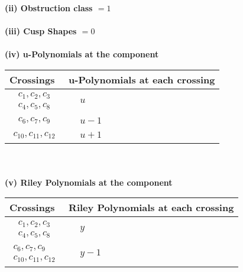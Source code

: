 \documentclass[1p]{elsarticle_modified}
\theoremstyle{definition}
\begin{document}
\flushleft \textbf{(ii) Obstruction class $= 1$}\\~\\
\flushleft \textbf{(iii) Cusp Shapes $= 0$}\\~\\
\newpage\renewcommand{\arraystretch}{1}
\flushleft \textbf{(iv) u-Polynomials at the component}\newline \\
\begin{tabular}{m{50pt}|m{274pt}}
Crossings & \hspace{64pt}u-Polynomials at each crossing \\
\hline $$\begin{aligned}c_{1},c_{2},c_{3}\\c_{4},c_{5},c_{8}\end{aligned}$$&$\begin{aligned}
&u
\end{aligned}$\\
\hline $$\begin{aligned}c_{6},c_{7},c_{9}\end{aligned}$$&$\begin{aligned}
&u-1
\end{aligned}$\\
\hline $$\begin{aligned}c_{10},c_{11},c_{12}\end{aligned}$$&$\begin{aligned}
&u+1
\end{aligned}$\\
\hline
\end{tabular}\\~\\
\newpage\renewcommand{\arraystretch}{1}
\flushleft \textbf{(v) Riley Polynomials at the component}\newline \\
\begin{tabular}{m{50pt}|m{274pt}}
Crossings & \hspace{64pt}Riley Polynomials at each crossing \\
\hline $$\begin{aligned}c_{1},c_{2},c_{3}\\c_{4},c_{5},c_{8}\end{aligned}$$&$\begin{aligned}
&y
\end{aligned}$\\
\hline $$\begin{aligned}c_{6},c_{7},c_{9}\\c_{10},c_{11},c_{12}\end{aligned}$$&$\begin{aligned}
&y-1
\end{aligned}$\\
\hline
\end{tabular}\\~\\
\end{document}
